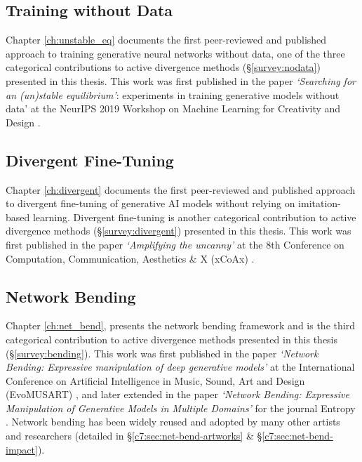 \subsection{Training without Data}

Chapter \ref{ch:unstable_eq} documents the first peer-reviewed and published approach to training generative neural networks without data, one of the three categorical contributions to active divergence methods (\S \ref{survey:nodata}) presented in this thesis.
This work was first published in the paper \textit{`Searching for an (un)stable equilibrium'}: experiments in training generative models without data' at the NeurIPS 2019 Workshop on Machine Learning for Creativity and Design \citep{broad2019searching}.

\subsection{Divergent Fine-Tuning}

Chapter \ref{ch:divergent} documents the first peer-reviewed and published approach to divergent fine-tuning of generative AI models without relying on imitation-based learning.
Divergent fine-tuning is another categorical contribution to active divergence methods (\S \ref{survey:divergent}) presented in this thesis.
This work was first published in the paper \textit{`Amplifying the uncanny'} at the 8th Conference on Computation, Communication, Aesthetics \& X (xCoAx) \citep{broad2020amplifying}.


\subsection{Network Bending}

Chapter \ref{ch:net_bend}, presents the network bending framework and is the third categorical contribution to active divergence methods presented in this thesis (\S \ref{survey:bending}).
This work was first published in the paper \textit{`Network Bending: Expressive manipulation of deep generative models'} at the International Conference on Artificial Intelligence in Music, Sound, Art and Design (EvoMUSART) \citep{broad2020network}, and later extended in the paper \textit{`Network Bending: Expressive Manipulation of Generative Models in Multiple Domains'} for the journal Entropy \citep{broad2021network}.
Network bending has been widely reused and adopted by many other artists and researchers (detailed in \S \ref{c7:sec:net-bend-artworks} \& \S \ref{c7:sec:net-bend-impact}).

